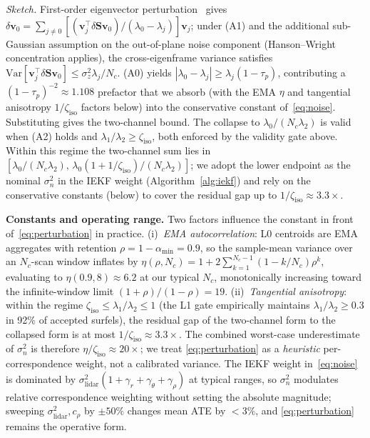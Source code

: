 \documentclass[conference]{IEEEtran}
\newcommand{\bvec}[1]{\mathbf{#1}}
\begin{document}
\textit{Sketch.}
First-order eigenvector perturbation~\cite{stewart1990matrix} gives
$\delta\bvec{v}_0 = \sum_{j\ne 0}
[(\bvec{v}_j^\top \delta\bvec{S}\bvec{v}_0)/(\lambda_0\!-\!\lambda_j)]\bvec{v}_j$;
under (A1) and the additional sub-Gaussian assumption on the
out-of-plane noise component (Hanson--Wright concentration applies),
the cross-eigenframe variance satisfies
$\mathrm{Var}[\bvec{v}_j^\top \delta\bvec{S}\bvec{v}_0]
\le\sigma_z^2\lambda_j/N_c$. (A0) yields
$|\lambda_0{-}\lambda_j|\ge\lambda_j(1{-}\tau_p)$, contributing a
$(1{-}\tau_p)^{-2}{\approx}1.108$ prefactor that we absorb (with the
EMA $\eta$ and tangential anisotropy $1/\zeta_\mathrm{iso}$ factors
below) into the conservative constant of~\eqref{eq:noise}.
Substituting gives the two-channel bound. The collapse to
$\lambda_0/(N_c\lambda_2)$ is valid when (A2) holds and
$\lambda_1/\lambda_2 \ge \zeta_\mathrm{iso}$, both enforced by the
validity gate above. Within this regime the two-channel sum lies in
$[\lambda_0/(N_c\lambda_2),\,\lambda_0(1{+}1/\zeta_\mathrm{iso})/(N_c\lambda_2)]$;
we adopt the lower endpoint as the nominal $\sigma^2_n$ in the IEKF
weight (Algorithm~\ref{alg:iekf}) and rely on the conservative
constants (below) to cover the residual gap up to
$1/\zeta_\mathrm{iso}{\approx}3.3{\times}$.

\textbf{Constants and operating range.}
Two factors influence the constant in front of~\eqref{eq:perturbation}
in practice. (i)~\emph{EMA autocorrelation}: L0 centroids are EMA
aggregates with retention $\rho{=}1{-}\alpha_{\min}{=}0.9$, so the
sample-mean variance over an $N_c$-scan window inflates by
$\eta(\rho,N_c) = 1 + 2\sum_{k=1}^{N_c-1}(1-k/N_c)\rho^k$,
evaluating to $\eta(0.9,8){\approx}6.2$ at our typical $N_c$,
monotonically increasing toward the infinite-window limit
$(1{+}\rho)/(1{-}\rho){=}19$. (ii)~\emph{Tangential anisotropy}:
within the regime
$\zeta_\mathrm{iso}\!\le\!\lambda_1/\lambda_2\!\le\!1$ (the L1 gate
empirically maintains $\lambda_1/\lambda_2 \ge 0.3$ in 92\% of accepted
surfels), the residual gap of the two-channel form to the collapsed
form is at most $1/\zeta_\mathrm{iso}{\approx}3.3{\times}$. The combined worst-case underestimate of $\sigma^2_n$ is therefore
$\eta/\zeta_\mathrm{iso}\!\approx\!20\times$; we treat
\eqref{eq:perturbation} as a \emph{heuristic} per-correspondence weight,
not a calibrated variance. The IEKF weight in~\eqref{eq:noise} is
dominated by $\sigma^2_\mathrm{lidar}(1{+}\gamma_r{+}\gamma_\theta{+}\gamma_\rho)$
at typical ranges, so $\sigma^2_n$ modulates relative correspondence
weighting without setting the absolute magnitude; sweeping
$\sigma^2_\mathrm{lidar},c_\rho$ by $\pm 50\%$ changes mean ATE by
${<}3\%$, and \eqref{eq:perturbation} remains the operative form.
\end{document}

